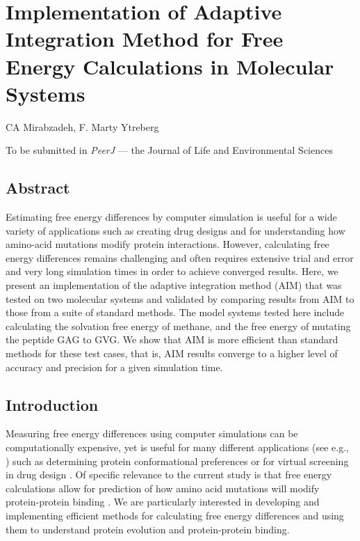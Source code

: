 \chapter{Implementation of Adaptive Integration Method for Free Energy Calculations in Molecular Systems}
CA Mirabzadeh, F. Marty Ytreberg

\begin{center}
    To be submitted in \textit{PeerJ} — the Journal of Life and Environmental Sciences
\end{center}

\section*{Abstract}
Estimating free energy differences by computer simulation is useful for a wide variety of applications such as creating drug designs and for understanding how amino-acid mutations modify protein interactions. However, calculating free energy differences remains challenging and often requires extensive trial and error and very long simulation times in order to achieve converged results. Here, we present an implementation of the adaptive integration method (AIM) that was tested on two molecular systems and validated by comparing results from AIM to those from a suite of standard methods. The model systems tested here include calculating the solvation free energy of methane, and the free energy of mutating the peptide GAG to GVG. We show that AIM is more efficient than standard methods for these test cases, that is, AIM results converge to a higher level of accuracy and precision for a given simulation time.

\section{Introduction}

Measuring free energy differences using computer simulations can be computationally expensive, yet is useful for many different applications (see e.g., \cite{Mobley2013,Zhan2013,Zhan2015,Wichman2016,Chodera2011a, SteinBrecher2010, Cournia2017, Miller2014, Petukh2015}) such as determining protein conformational preferences or for virtual screening in drug design \cite{Zhan2015, SteinBrecher2010, Chodera2011a}. Of specific relevance to the current study is that free energy calculations allow for prediction of how amino acid mutations will modify protein-protein binding \cite{Wichman2016, Zhan2013, Miller2014, Petukh2015}. We are particularly interested in developing and implementing efficient methods for calculating free energy differences and using them to understand protein evolution and protein-protein binding. 

